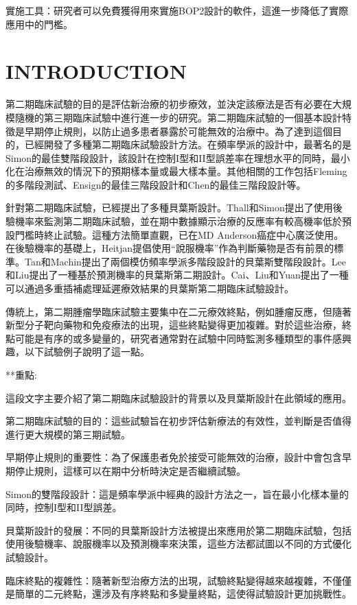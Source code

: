 實施工具：研究者可以免費獲得用來實施BOP2設計的軟件，這進一步降低了實際應用中的門檻。
\section{INTRODUCTION}
第二期臨床試驗的目的是評估新治療的初步療效，並決定該療法是否有必要在大規模隨機的第三期臨床試驗中進行進一步的研究。第二期臨床試驗的一個基本設計特徵是早期停止規則，以防止過多患者暴露於可能無效的治療中。為了達到這個目的，已經開發了多種第二期臨床試驗設計方法。在頻率學派的設計中，最著名的是Simon的最佳雙階段設計，該設計在控制I型和II型誤差率在理想水平的同時，最小化在治療無效的情況下的預期樣本量或最大樣本量。其他相關的工作包括Fleming的多階段測試、Ensign的最佳三階段設計和Chen的最佳三階段設計等。

針對第二期臨床試驗，已經提出了多種貝葉斯設計。Thall和Simon提出了使用後驗機率來監測第二期臨床試驗，並在期中數據顯示治療的反應率有較高機率低於預設門檻時終止試驗。這種方法簡單直觀，已在MD Anderson癌症中心廣泛使用。在後驗機率的基礎上，Heitjan提倡使用“說服機率”作為判斷藥物是否有前景的標準。Tan和Machin提出了兩個模仿頻率學派多階段設計的貝葉斯雙階段設計。Lee和Liu提出了一種基於預測機率的貝葉斯第二期設計。Cai、Liu和Yuan提出了一種可以通過多重插補處理延遲療效結果的貝葉斯第二期臨床試驗設計。

傳統上，第二期腫瘤學臨床試驗主要集中在二元療效終點，例如腫瘤反應，但隨著新型分子靶向藥物和免疫療法的出現，這些終點變得更加複雜。對於這些治療，終點可能是有序的或多變量的，研究者通常對在試驗中同時監測多種類型的事件感興趣，以下試驗例子說明了這一點。

**重點:

這段文字主要介紹了第二期臨床試驗設計的背景以及貝葉斯設計在此領域的應用。

第二期臨床試驗的目的：這些試驗旨在初步評估新療法的有效性，並判斷是否值得進行更大規模的第三期試驗。

早期停止規則的重要性：為了保護患者免於接受可能無效的治療，設計中會包含早期停止規則，這樣可以在期中分析時決定是否繼續試驗。

Simon的雙階段設計：這是頻率學派中經典的設計方法之一，旨在最小化樣本量的同時，控制I型和II型誤差。

貝葉斯設計的發展：不同的貝葉斯設計方法被提出來應用於第二期臨床試驗，包括使用後驗機率、說服機率以及預測機率來決策，這些方法都試圖以不同的方式優化試驗設計。

臨床終點的複雜性：隨著新型治療方法的出現，試驗終點變得越來越複雜，不僅僅是簡單的二元終點，還涉及有序終點和多變量終點，這使得試驗設計更加挑戰性。


